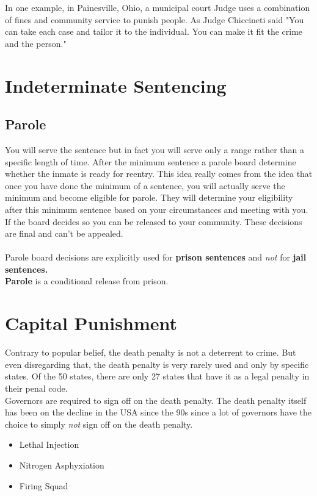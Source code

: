 \documentclass[10pt]{article}
\begin{document}
In one example, in Painesville, Ohio, a municipal court Judge uses a combination of fines and community service to punish people. As Judge Chiccineti said "You can take each case and tailor it to the individual. You can make it fit the crime and the person."

\section*{Indeterminate Sentencing}
\subsection*{Parole}
You will serve the sentence but in fact you will serve only a range rather than a specific length of time. After the minimum sentence a parole board determine whether the inmate is ready for reentry. This idea really comes from the idea that once you have done the minimum of a sentence, you will actually serve the minimum and become eligible for parole. They will determine your eligibility after this minimum sentence based on your circumstances and meeting with you. If the board decides so you can be released to your community. These decisions are final and can't be appealed.\\\\
Parole board decisions are explicitly used for \textbf{prison sentences} and \textit{not} for \textbf{jail sentences.}\\
\textbf{Parole} is a conditional release from prison.\\

\section*{Capital Punishment}
Contrary to popular belief, the death penalty is not a deterrent to crime. But even disregarding that, the death penalty is very rarely used and only by specific states. Of the 50 states, there are only 27 states that have it as a legal penalty in their penal code.\\
Governors are required to sign off on the death penalty. The death penalty itself has been on the decline in the USA since the 90s since a lot of governors have the choice to simply \textit{not} sign off on the death penalty.\\
\begin{itemize}
    \item Lethal Injection
    \item Nitrogen Asphyxiation
    \item Firing Squad
\end{itemize}
\end{document}
